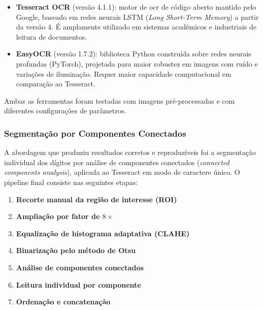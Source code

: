 \begin{itemize}
    \item \textbf{Tesseract OCR} (versão 4.1.1): motor de \gls{ocr} de código aberto mantido pelo Google, baseado em redes neurais LSTM (\textit{Long Short-Term Memory}) a partir da versão 4. É amplamente utilizado em sistemas acadêmicos e industriais de leitura de documentos.

    \item \textbf{EasyOCR} (versão 1.7.2): biblioteca Python construída sobre redes neurais profundas (PyTorch), projetada para maior robustez em imagens com ruído e variações de iluminação. Requer maior capacidade computacional em comparação ao Tesseract.
\end{itemize}

Ambas as ferramentas foram testadas com imagens pré-processadas e com diferentes configurações de parâmetros.

\subsubsection{Segmentação por Componentes Conectados}

A abordagem que produziu resultados corretos e reproduzíveis foi a segmentação individual dos dígitos por análise de componentes conectados (\textit{connected components analysis}), aplicada ao Tesseract em modo de caractere único. O pipeline final consiste nas seguintes etapas:

\begin{enumerate}
    \item \textbf{Recorte manual da região de interesse (ROI)} 

    \item \textbf{Ampliação por fator de $8\times$}

    \item \textbf{Equalização de histograma adaptativa (CLAHE)} 

    \item \textbf{Binarização pelo método de Otsu} 

    \item \textbf{Análise de componentes conectados} 

    \item \textbf{Leitura individual por componente} 

    \item \textbf{Ordenação e concatenação} 
\end{enumerate}

